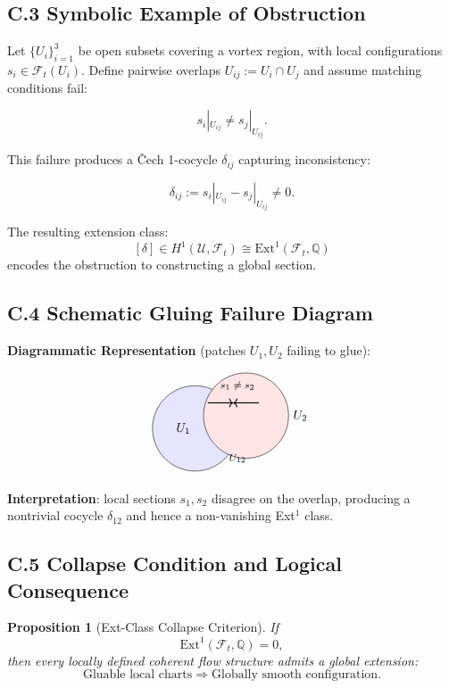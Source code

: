 \documentclass[11pt]{article}
\newtheorem{proposition}[theorem]{Proposition}
\begin{document}
\subsection{C.3 Symbolic Example of Obstruction}

Let \( \{U_i\}_{i=1}^3 \) be open subsets covering a vortex region, with local configurations \( s_i \in \mathcal{F}_t(U_i) \). Define pairwise overlaps \( U_{ij} := U_i \cap U_j \) and assume matching conditions fail:

\[
s_i|_{U_{ij}} \neq s_j|_{U_{ij}}.
\]

This failure produces a Čech 1-cocycle $\delta_{ij}$ capturing inconsistency:

\[
\delta_{ij} := s_i|_{U_{ij}} - s_j|_{U_{ij}} \neq 0.
\]

The resulting extension class:
\[
[\delta] \in H^1(\mathcal{U}, \mathcal{F}_t) \cong \mathrm{Ext}^1(\mathcal{F}_t, \mathbb{Q})
\]
encodes the obstruction to constructing a global section.

\subsection{C.4 Schematic Gluing Failure Diagram}

\vspace{1em}
\noindent
\textbf{Diagrammatic Representation} (patches $U_1, U_2$ failing to glue):

\[
\begin{tikzpicture}[scale=1.2]
\draw[fill=blue!10] (0,0) circle (1);
\draw[fill=red!10] (1.2,0.3) circle (1);
\draw[thick] (0,0) node[left] {$U_1$};
\draw[thick] (2.2,0.3) node[right] {$U_2$};
\draw[->, thick] (0.3,0.6) -- (0.9,0.6);
\draw[->, thick] (1.5,0.6) -- (0.9,0.6);
\node at (1.0,1.0) {\footnotesize $s_1 \neq s_2$};
\node at (1.0,-0.7) {\footnotesize $U_{12}$};
\end{tikzpicture}
\]

\noindent
\textbf{Interpretation}: local sections $s_1, s_2$ disagree on the overlap, producing a nontrivial cocycle $\delta_{12}$ and hence a non-vanishing Ext$^1$ class.

\subsection{C.5 Collapse Condition and Logical Consequence}

\begin{proposition}[Ext-Class Collapse Criterion]
If
\[
\mathrm{Ext}^1(\mathcal{F}_t, \mathbb{Q}) = 0,
\]
then every locally defined coherent flow structure admits a global extension:
\[
\text{Gluable local charts} \Rightarrow \text{Globally smooth configuration}.
\]
\end{proposition}
\end{document}
